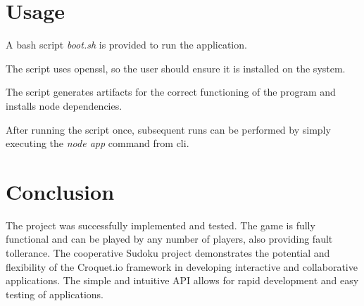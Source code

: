 \documentclass[12pt, a4paper]{report}
\begin{document}
\chapter{Usage}
A bash script \emph{boot.sh} is provided to run the application.

The script uses openssl, so the user should ensure it is installed on the system.

The script generates artifacts for the correct functioning of the program and installs node dependencies.

After running the script once, subsequent runs can be performed by simply executing the \emph{node app} command from cli.

\chapter{Conclusion}
The project was successfully implemented and tested. The game is fully functional and can be played by any 
 number of players, also providing fault tollerance. The cooperative Sudoku project demonstrates the potential and
 flexibility of the Croquet.io framework in developing interactive and collaborative applications. The simple and 
 intuitive API allows for rapid development and easy testing of applications.



\end{document}
